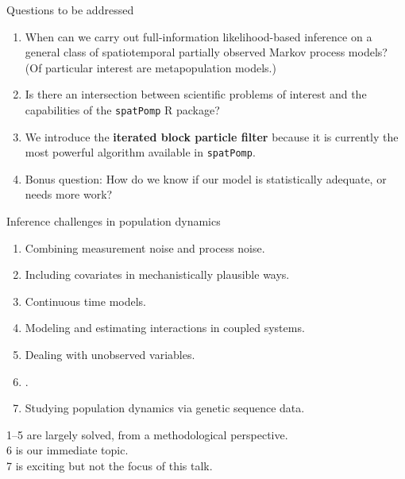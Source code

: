 \documentclass{beamer}
\begin{document}
\begin{frame}{Questions to be addressed}

  \begin{enumerate}
  \item When can we carry out full-information likelihood-based inference on a general class of spatiotemporal partially observed Markov process models? (Of particular interest are metapopulation models.)

    \vspace{2mm}
    
  \item Is there an intersection between scientific problems of interest and the capabilities of the \texttt{spatPomp} R package?

        \vspace{2mm}

\item We introduce the {\bf iterated block particle filter} because it is currently the most powerful algorithm available in \texttt{spatPomp}.

  \vspace{2mm}

\item Bonus question: How do we know if our model is statistically adequate, or needs more work?
  
    \end{enumerate}
\end{frame}

\newcommand\challengeSep{\vspace{3mm}}

\begin{frame}{Inference challenges in population dynamics}

  \begin{enumerate}
\item Combining measurement noise and process noise.
\item Including covariates in mechanistically plausible ways.
\item  Continuous time models.
\item  Modeling and estimating interactions in coupled systems.
\item  Dealing with unobserved variables.
\item  {}.
\item  Studying population dynamics via genetic sequence data.
  \end{enumerate}

  \vspace{4mm}
  
  1--5 are largely solved, from a methodological perspective.\\
  6 is our immediate topic.\\
  7 is exciting but not the focus of this talk.


  \vspace{4mm}

  
\end{frame}
\end{document}

